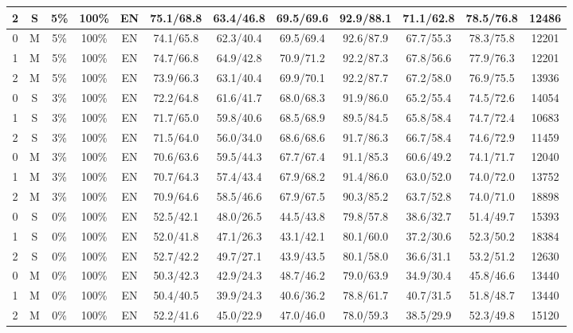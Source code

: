 \begin{table*}
{\begin{tabular}{|c|c|c|c|c||c|c|c|c|c|c||c|}
2 & S & 5\% & 100\% & EN & 75.1/68.8 & 63.4/46.8 & 69.5/69.6 & 92.9/88.1 & 71.1/62.8 & 78.5/76.8 & 12486 \\ \hline
0 & M & 5\% & 100\% & EN & 74.1/65.8 & 62.3/40.4 & 69.5/69.4 & 92.6/87.9 & 67.7/55.3 & 78.3/75.8 & 12201 \\ \hline
1 & M & 5\% & 100\% & EN & 74.7/66.8 & 64.9/42.8 & 70.9/71.2 & 92.2/87.3 & 67.8/56.6 & 77.9/76.3 & 12201 \\ \hline
2 & M & 5\% & 100\% & EN & 73.9/66.3 & 63.1/40.4 & 69.9/70.1 & 92.2/87.7 & 67.2/58.0 & 76.9/75.5 & 13936 \\ \hline
0 & S & 3\% & 100\% & EN & 72.2/64.8 & 61.6/41.7 & 68.0/68.3 & 91.9/86.0 & 65.2/55.4 & 74.5/72.6 & 14054 \\ \hline
1 & S & 3\% & 100\% & EN & 71.7/65.0 & 59.8/40.6 & 68.5/68.9 & 89.5/84.5 & 65.8/58.4 & 74.7/72.4 & 10683 \\ \hline
2 & S & 3\% & 100\% & EN & 71.5/64.0 & 56.0/34.0 & 68.6/68.6 & 91.7/86.3 & 66.7/58.4 & 74.6/72.9 & 11459 \\ \hline
0 & M & 3\% & 100\% & EN & 70.6/63.6 & 59.5/44.3 & 67.7/67.4 & 91.1/85.3 & 60.6/49.2 & 74.1/71.7 & 12040 \\ \hline
1 & M & 3\% & 100\% & EN & 70.7/64.3 & 57.4/43.4 & 67.9/68.2 & 91.4/86.0 & 63.0/52.0 & 74.0/72.0 & 13752 \\ \hline
2 & M & 3\% & 100\% & EN & 70.9/64.6 & 58.5/46.6 & 67.9/67.5 & 90.3/85.2 & 63.7/52.8 & 74.0/71.0 & 18898 \\ \hline
0 & S & 0\% & 100\% & EN & 52.5/42.1 & 48.0/26.5 & 44.5/43.8 & 79.8/57.8 & 38.6/32.7 & 51.4/49.7 & 15393 \\ \hline
1 & S & 0\% & 100\% & EN & 52.0/41.8 & 47.1/26.3 & 43.1/42.1 & 80.1/60.0 & 37.2/30.6 & 52.3/50.2 & 18384 \\ \hline
2 & S & 0\% & 100\% & EN & 52.7/42.2 & 49.7/27.1 & 43.9/43.5 & 80.1/58.0 & 36.6/31.1 & 53.2/51.2 & 12630 \\ \hline
0 & M & 0\% & 100\% & EN & 50.3/42.3 & 42.9/24.3 & 48.7/46.2 & 79.0/63.9 & 34.9/30.4 & 45.8/46.6 & 13440 \\ \hline
1 & M & 0\% & 100\% & EN & 50.4/40.5 & 39.9/24.3 & 40.6/36.2 & 78.8/61.7 & 40.7/31.5 & 51.8/48.7 & 13440 \\ \hline
2 & M & 0\% & 100\% & EN & 52.2/41.6 & 45.0/22.9 & 47.0/46.0 & 78.0/59.3 & 38.5/29.9 & 52.3/49.8 & 15120 \\ \hline
\end{tabular}
}
\end{table*}


